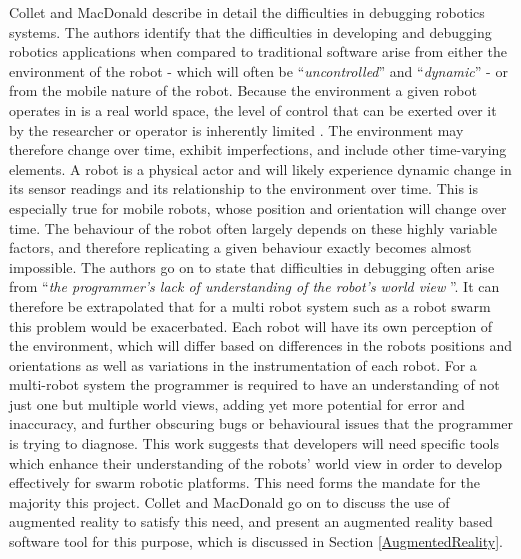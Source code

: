 Collet and MacDonald \cite{Collet:2006} describe in detail the difficulties in debugging robotics systems. The authors identify that the difficulties in developing and debugging robotics applications when compared to traditional software arise from either the environment of the robot - which will often be ``\textit{uncontrolled}'' and ``\textit{dynamic}'' - or from the mobile nature of the robot. Because the environment a given robot operates in is a real world space, the level of control that can be exerted over it by the researcher or operator is inherently limited \cite{Collet:2006}. The environment may therefore change over time, exhibit imperfections, and include other time-varying elements. A robot is a physical actor and will likely experience dynamic change in its sensor readings and its relationship to the environment over time. This is especially true for mobile robots, whose position and orientation will change over time. The behaviour of the robot often largely depends on these highly variable factors, and therefore replicating a given behaviour exactly becomes almost impossible. The authors go on to state that difficulties in debugging often arise from ``\textit{the programmer's lack of understanding of the robot's world view} \cite{Collet:2006}''. It can therefore be extrapolated that for a multi robot system such as a robot swarm this problem would be exacerbated. Each robot will have its own perception of the environment, which will differ based on differences in the robots positions and orientations as well as variations in the instrumentation of each robot. For a multi-robot system the programmer is required to have an understanding of not just one but multiple world views, adding yet more potential for error and inaccuracy, and further obscuring bugs or behavioural issues that the programmer is trying to diagnose. This work \cite{Collet:2006} suggests that developers will need specific tools which enhance their understanding of the robots' world view in order to develop effectively for swarm robotic platforms. This need forms the mandate for the majority this project. Collet and MacDonald \cite{Collet:2006} go on to discuss the use of augmented reality to satisfy this need, and present an augmented reality based software tool for this purpose, which is discussed in Section \ref{AugmentedReality}.

